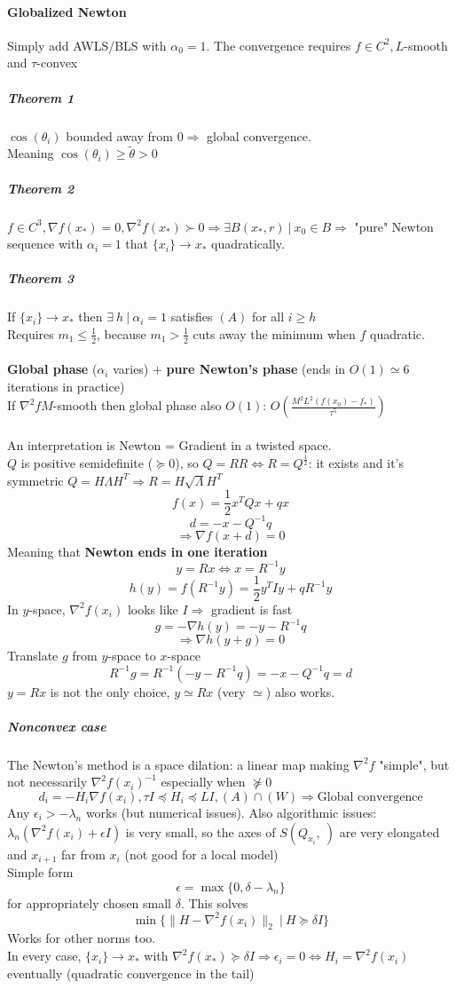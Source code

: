 \documentclass[10pt]{report}
\begin{document}
\paragraph{Globalized Newton} Simply add AWLS/BLS with $\alpha_0 = 1$. The convergence requires $f\in C^2, L$-smooth and $\tau$-convex
\subparagraph{Theorem 1} $\cos(\theta_i)$ bounded away from $0 \Rightarrow$ global convergence.\\
Meaning $\cos(\theta_i)\geq \tilde{\theta} > 0$
\subparagraph{Theorem 2} $f\in C^3, \nabla f(x_*) = 0, \nabla^2 f(x_*)\succ 0\Rightarrow\exists B(x_*, r)\:|\:x_0\in B\Rightarrow$ "pure" Newton sequence with $\alpha_i = 1$ that $\{x_i\}\rightarrow x_*$ quadratically.
\subparagraph{Theorem 3} If $\{x_i\}\rightarrow x_*$ then $\exists\:h\:|\:\alpha_i = 1$ satisfies $(A)$ for all $i\geq h$\\
Requires $m_1\leq \frac{1}{2}$, because $m_1>\frac{1}{2}$ cuts away the minimum when $f$ quadratic.\\\\
\textbf{Global phase} ($\alpha_i$ varies) $+$ \textbf{pure Newton's phase} (ends in $O(1)\simeq 6$ iterations in practice)\\
If $\nabla^2 f M$-smooth then global phase also $O(1)$: $O\left(\displaystyle \frac{M^2L^2(f(x_0)-f_*)}{\displaystyle \tau^5}\right)$\\\\
An interpretation is Newton = Gradient in a twisted space.\\
$Q$ is positive semidefinite ($\succeq 0$), so $Q= RR\Leftrightarrow R = Q^{\frac{1}{2}}$: it exists and it's symmetric $Q=H\Lambda H^T\Rightarrow R = H\sqrt{\Lambda}H^T$
$$f(x) = \frac{1}{2}x^TQx + qx$$ $$d = -x-Q^{-1}q$$ $$\Rightarrow \nabla f(x+d)=0$$ Meaning that \textbf{Newton ends in one iteration} $$y = Rx \Leftrightarrow x = R^{-1}y$$ $$h(y) = f(R^{-1}y) = \frac{1}{2}y^TIy + qR^{-1}y$$ In $y$-space, $\nabla^2 f(x_i)$ looks like $I\Rightarrow$ gradient is fast $$g = -\nabla h(y) = -y-R^{-1}q$$ $$\Rightarrow \nabla h(y+g) = 0$$
Translate $g$ from $y$-space to $x$-space
$$R^{-1}g=R^{-1}(-y-R^{-1}q) = -x-Q^{-1}q = d$$
$y = Rx$ is not the only choice, $y\simeq Rx$ (very $\simeq$) also works.
\subparagraph{Nonconvex case} The Newton's method is a space dilation: a linear map making $\nabla^2 f$ "simple", but not necessarily $\nabla^2f(x_i)^{-1}$ especially when $\not\succeq 0$
$$d_i=-H_{i}\nabla f(x_i),\tau I\preceq H_i\preceq LI, (A)\cap (W)\Rightarrow\text{Global convergence}$$
Any $\epsilon_i > -\lambda_n$ works (but numerical issues). Also algorithmic issues: $\lambda_n(\nabla^2 f(x_i)+\epsilon I)$ is very small, so the axes of $S(Q_{x_i},\:)$ are very elongated and $x_{i+1}$ far from $x_i$ (not good for a local model)\\
Simple form $$\epsilon = \max\{0,\delta - \lambda_n\}$$ for appropriately chosen small $\delta$. This solves $$\min\{\|H-\nabla^2 f(x_i)\|_2\:|\:H\succeq \delta I\}$$ Works for other norms too.\\
In every case, $\{x_i\}\rightarrow x_*$ with $\nabla^2 f(x_*)\succeq \delta I\Rightarrow \epsilon_i = 0 \Leftrightarrow H_i = \nabla^2 f(x_i)$ eventually (quadratic convergence in the tail)
\end{document}
